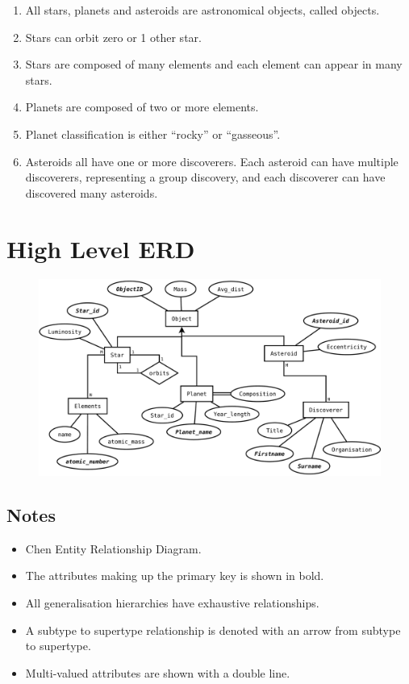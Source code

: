 \documentclass[11pt]{article} %
\begin{document}
\begin{enumerate}
	\item All stars, planets and asteroids are astronomical objects, called
		objects.
	\item Stars can orbit zero or 1 other star.
	\item Stars are composed of many elements and each element can appear in
		many stars.
	\item Planets are composed of two or more elements.
	\item Planet classification is either ``rocky'' or ``gasseous''.
	\item Asteroids all have one or more discoverers. Each asteroid can have
		multiple discoverers, representing a group discovery, and each
		discoverer can have discovered many asteroids.
\end{enumerate}


\newpage
\section{High Level ERD}

\begin{figure}[h!]
	\centering
	\includegraphics[width=1.0\textwidth]{ERD-high.pdf}
\end{figure}

\subsection{Notes}

\begin{itemize}
	\item Chen Entity Relationship Diagram.
	\item The attributes making up the primary key is shown in bold.
	\item All generalisation hierarchies have exhaustive relationships.
	\item A subtype to supertype relationship is denoted with an arrow from
		subtype to supertype.
	\item Multi-valued attributes are shown with a double line.
\end{itemize}
\end{document}

